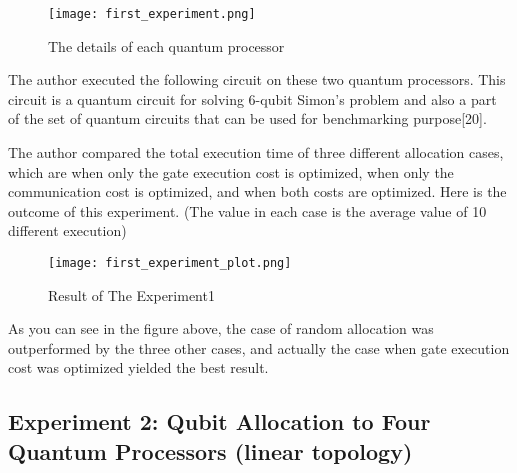  \begin{figure}[h]
  		\begin{center}
  			\texttt{[image: first\_experiment.png]}
			\caption{The details of each quantum processor}
			\label{Fig4}
		\end{center}
	\end{figure}
 
 The author executed the following circuit on these two quantum processors.  This circuit is a quantum circuit for solving 6-qubit Simon's problem and also a part of the set of quantum circuits that can be used for benchmarking purpose[20]. 
 \newline
 \newline
  \newline
 \newline
 The author compared the total execution time of three different allocation cases, which are when only the gate execution cost is optimized, when only the communication cost is optimized, and when both costs are optimized.  Here is the outcome of this experiment.  (The value in each case is the average value of 10 different execution)
 \newpage
  \begin{figure}[h]
  		\begin{center}
  			\texttt{[image: first\_experiment\_plot.png]}
			\caption{Result of The Experiment1}
			\label{Fig4}
		\end{center}
	\end{figure}
 
 As you can see in the figure above, the case of random allocation was outperformed by the three other cases, and actually the case when gate execution cost was optimized yielded the best result.
 
\subsection{Experiment 2: Qubit Allocation to Four Quantum Processors (linear topology)}
